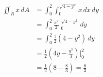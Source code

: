 \documentclass[handout]{ximera}
\begin{document}
\begin{example}[Example 2]
\begin{align*}
\iint_R x \, dA & = \int_0^2 \int_0^{\sqrt{4 - y^2}} x \, dx \, dy\\
                 & = \int_0^2  \frac{x^2}{2} \bigg|_{0}^{\sqrt{4 - y^2}} \, dy\\
                 & = \int_0^2  \frac12(4-y^2) \, dy\\
                 &= \frac12 \left(4y - \frac{y^3}{3}\right)  \bigg|_0^2\\
                 &= \frac12 \left(8 - \frac83\right) = \frac{8}{3}
\end{align*} 





\end{example}
\end{document}
